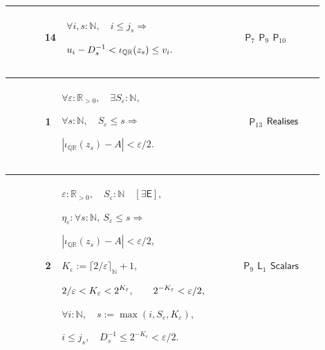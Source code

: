 \documentclass[12pt,reqno]{amsart}
\theoremstyle{blueplain}
\numberwithin{equation}{section}
\begin{document}
{\scriptsize \setlength{\parskip}{0pt}\nointerlineskip
\noindent 
\begin{tabular}{|@{}>{\centering\arraybackslash}m{0.10658\linewidth}|>{\centering\arraybackslash}m{0.03553\linewidth}|>{\centering\arraybackslash}m{0.52105\linewidth}|>{\centering\arraybackslash}m{0.23684\linewidth}|}
\hline
{\hypertarget{row:P14}{$\mathsf{P}$}} & {14} & {$\displaystyle \forall i,s:%
\mathbb{N},\quad i\le j_s\Rightarrow$ \par$\displaystyle u_i-D_s^{-1}<\iota_{%
\mathbb{Q}\mathbb{R}}(z_s)\le v_i.$} & {\hyperlink{row:P7}{$\mathsf{P}_{7}$} 
\hyperlink{row:P9}{$\mathsf{P}_{9}$} \hyperlink{row:P10}{$\mathsf{P}_{10}$}}
\\ \hline
\end{tabular}%
}

{\scriptsize \setlength{\parskip}{0pt}\nointerlineskip
\noindent 
\begin{tabular}{|@{}>{\centering\arraybackslash}m{0.10658\linewidth}|>{\centering\arraybackslash}m{0.03553\linewidth}|>{\centering\arraybackslash}m{0.52105\linewidth}|>{\centering\arraybackslash}m{0.23684\linewidth}|}
\hline
{\hypertarget{row:L1}{$\mathsf{L}$}} & {1} & {$\displaystyle %
\forall\varepsilon:\mathbb{R}_{>0},\quad\exists S_\varepsilon:\mathbb{N},$ %
\par$\displaystyle \forall s:\mathbb{N},\quad S_\varepsilon\le s\Rightarrow$ %
\par$\displaystyle |\iota_{\mathbb{Q}\mathbb{R}}(z_s)-A|<\varepsilon/2.$} & {%
\ \hyperlink{row:P13}{$\mathsf{P}_{13}$} \hyperlink{def:Realises}{$\mathsf{%
Realises}$}} \\ \hline
\end{tabular}
}

{\scriptsize \setlength{\parskip}{0pt}\nointerlineskip
\noindent 
\begin{tabular}{|@{}>{\centering\arraybackslash}m{0.10658\linewidth}|>{\centering\arraybackslash}m{0.03553\linewidth}|>{\centering\arraybackslash}m{0.52105\linewidth}|>{\centering\arraybackslash}m{0.23684\linewidth}|}
\hline
{\hypertarget{row:L2}{$\mathsf{L}$}} & {2} & {$\displaystyle \varepsilon:%
\mathbb{R}_{>0},\quad S_\varepsilon:\mathbb{N}\quad[\exists\mathsf{E}],$ \par%
$\displaystyle \eta_\varepsilon:\forall s:\mathbb{N},\ S_\varepsilon\le
s\Rightarrow$ \par$\displaystyle |\iota_{\mathbb{Q}\mathbb{R}%
}(z_s)-A|<\varepsilon/2,$ \par$\displaystyle K_\varepsilon:=\lceil2/%
\varepsilon\rceil_{\mathbb{N}}+1,$ \par$\displaystyle 2/\varepsilon<K_%
\varepsilon<2^{K_\varepsilon},\qquad2^{-K_\varepsilon}<\varepsilon/2,$ \par$%
\displaystyle \forall i:\mathbb{N},\quad
s:=\max(i,S_\varepsilon,K_\varepsilon),$ \par$\displaystyle i\le j_s,\quad
D_s^{-1}\le2^{-K_\varepsilon}<\varepsilon/2.$} & {\hyperlink{row:P9}{$%
\mathsf{P}_{9}$} \hyperlink{row:L1}{$\mathsf{L}_{1}$} \hyperlink{def:Scalars}%
{$\mathsf{Scalars}$}} \\ \hline
\end{tabular}
}
\end{document}

